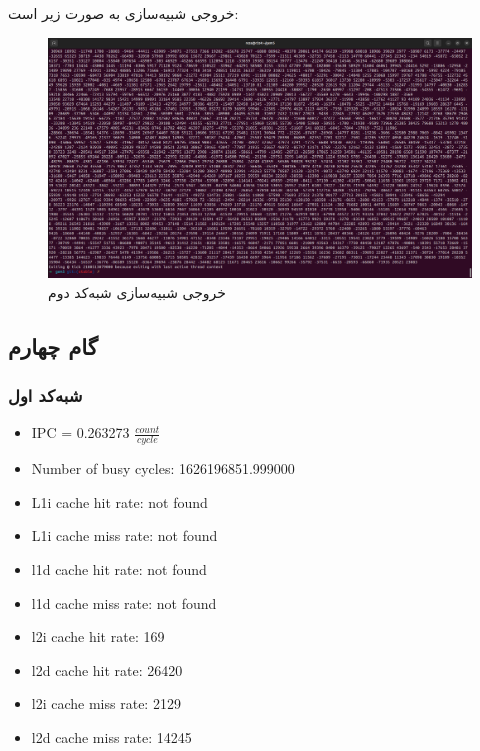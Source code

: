 \documentclass[12pt]{exam}
\begin{document}
\begin{multicols}{1}
	
	 خروجی شبیه‌سازی به صورت زیر است:
	\begin{center}
		\begin{figure}[H]
			\includegraphics[scale=0.12]{images/img10.png}
			\caption{خروجی شبیه‌سازی شبه‌کد دوم}
			\label{خروجی شبیه‌سازی شبه‌کد دوم}
		\end{figure}
	\end{center}
	
	
	
	\subsection{گام چهارم}
	\subsubsection{شبه‌کد اول}
	
	\begin{latin}
		\begin{itemize}
			\item IPC = 0.263273 $\frac{count}{cycle}$
			\item Number of busy cycles: 1626196851.999000
			\item L1i cache hit rate: not found
			\item L1i cache miss rate: not found
			\item l1d cache hit rate: not found
			\item l1d cache miss rate: not found
			\item l2i cache hit rate: 169
			\item l2d cache hit rate: 26420
			\item l2i cache miss rate: 2129
			\item l2d cache miss rate: 14245
		\end{itemize}
	\end{latin}
	

\end{multicols}
\end{document}
